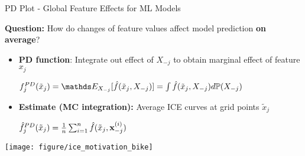 \documentclass[11pt,compress,t,notes=noshow, aspectratio=169, xcolor=table,dvipsnames]{beamer}
\begin{document}
\begin{frame}{PD Plot - Global Feature Effects for ML Models}

\textbf{Question:} How do changes of feature values affect model prediction \textbf{on average}?


\begin{itemize}
    \item \textbf{PD function}: Integrate out effect of $X_{-j}$ to obtain marginal effect of feature $x_j$
    
    \medskip
    
    \centerline{$ \textstyle
    f_j^{PD}(\tilde x_j) = \E_{X_{-j}}[\hat f(\tilde x_j, X_{-j})] = \int \hat f(\tilde x_j, X_{-j}) d \mathbb{P}(X_{-j})
    $}

    \smallskip
    
    \item \textbf{Estimate (MC integration):} Average ICE curves at grid points $\tilde x_j$
    
    \medskip
    
    \centerline{$ \textstyle
    \hat f_j^{PD}(\tilde x_j) = \frac{1}{n} \sum_{i=1}^{n} \hat f(\tilde x_j, \mathbf{x}_{-j}^{(i)})
    $}
\end{itemize}


\vfill
\centering
\texttt{[image: figure/ice\_motivation\_bike]}

\end{frame}
\end{document}
